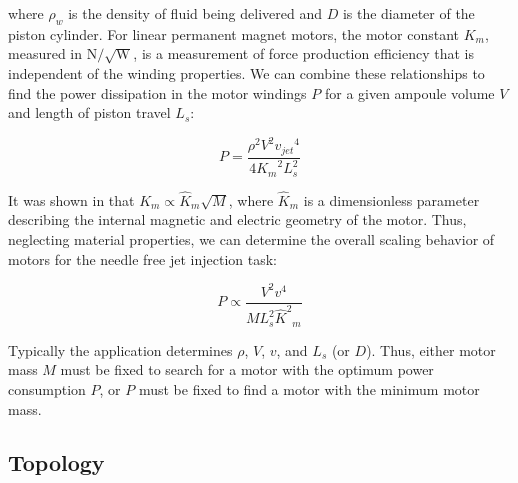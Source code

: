         
        where $\rho_w$ is the density of fluid being delivered and $D$ is the diameter of the piston cylinder. For linear permanent magnet motors, the motor constant $K_m$, measured in $\mathrm{N/\sqrt{W}}$, is a measurement of force production efficiency that is independent of the winding properties. We can combine these relationships to find the power dissipation in the motor windings $P$ for a given ampoule volume $V$ and length of piston travel $L_s$:


        \begin{equation}
            P=\frac{\rho^2V^2{v_{jet}}^4}{4{K_m}^2 L_s^2}
            \label{eq:power dissipation for PMLSMs}
        \end{equation}
        
        
        It was shown in \cite{Ruddy2011a} that $K_m \propto {\hat K}_m \sqrt M$, where ${\hat K}_m$ is a dimensionless parameter describing the internal magnetic and electric geometry of the motor. Thus, neglecting material properties, we can determine the overall scaling behavior of motors for the needle free jet injection task:
        
        
        \begin{equation}
            P\propto\frac{V^2v^4}{ {M L_s^2{\hat K^2}_m} }
            \label{eq:scaling law for PMLSMs}
        \end{equation}
        
        
        Typically the application determines $\rho$, $V$, $v$, and $L_s$ (or $D$). Thus, either motor mass $M$ must be fixed to search for a motor with the optimum power consumption $P$, or $P$ must be fixed to find a motor with the minimum motor mass.


    \subsection{Topology}                       \label{Chapter:PMLSM design HM/electromagnetic model/topology}
    
